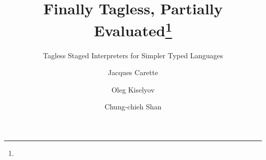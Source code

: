 \documentclass[oribibl,orivec]{llncs}
\begin{document}
\title{Finally Tagless, Partially Evaluated\thanks{\ourthanks}}
\subtitle{Tagless Staged Interpreters for Simpler Typed Languages}
\author{Jacques Carette \and Oleg Kiselyov \and Chung-chieh Shan}

\maketitle

\end{document}
